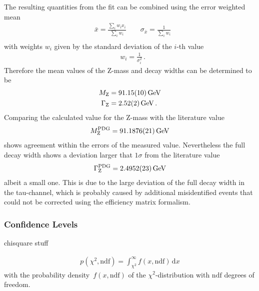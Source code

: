 \documentclass[11pt, a4paper]{article}
\numberwithin{equation}{section}
\newcommand\dinf[1]{ \,\mathrm{d}#1 }
\begin{document}
The resulting quantities from the fit can be combined using the error weighted mean
\begin{align*}
	&\bar{x} = \frac{\sum_i w_i x_i}{\sum_i w_i} \qquad \sigma_{\bar{x}} = \frac{1}{\sum_i w_i}\\	
\end{align*}
with weights $w_i$ given by the standard deviation of the $i$-th value
\begin{align*}
	&w_i = \frac{1}{\sigma_i^2} \, \text{.}
\end{align*}
Therefore the mean values of the Z-mass and decay widths can be determined to be
\begin{align*}
	M_\mathrm{Z} &= \SI{91.15 +- 0.10}{GeV}\\
	\Gamma_\mathrm{Z} &= \SI{2.52 +- 0.02}{GeV} \,\text{.}
\end{align*}
Comparing the calculated value for the Z-mass with the literature value \cite{pdg}
\begin{align*}
	M_\mathrm{Z}^\mathrm{PDG} = \SI{91.1876 +- 0.0021}{GeV}
\end{align*}
shows agreement within the errors of the measured value.
Nevertheless the full decay width shows a deviation larger that $1\sigma$ from the literature value \cite{pdg}
\begin{align*}
	\Gamma_\mathrm{Z}^\mathrm{PDG} = \SI{2.4952 +- 0.0023}{GeV}
\end{align*}
albeit a small one.
This is due to the large deviation of the full decay width in the tau-channel, which is probably caused by additional misidentified events that could not be corrected using the efficiency matrix formalism.

\subsubsection{Confidence Levels}
\begin{table}
	\centering
	
	\caption{chisquare stuff}
\end{table}

\begin{align*}
	p(\chi^2, \mathrm{ndf}) = \int_{\chi^2}^\infty f(x, \mathrm{ndf}) \dinf{x}
\end{align*}
with the probability density~$f(x, \mathrm{ndf})$ of the $\chi^2$-distribution with $\mathrm{ndf}$ degrees of freedom.
\end{document}
